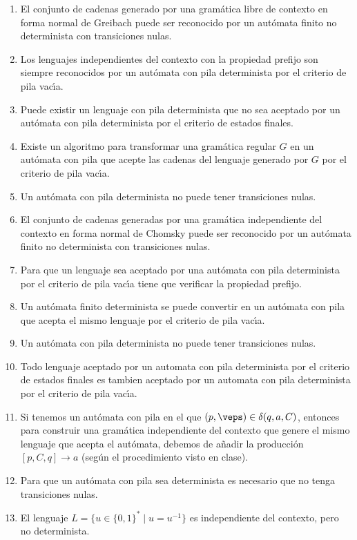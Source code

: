 \begin{enumerate}
    \item El conjunto de cadenas generado por una gramática libre de contexto en forma normal de Greibach puede ser reconocido por un autómata finito no determinista con transiciones nulas.
    \item Los lenguajes independientes del contexto con la propiedad prefijo son siempre reconocidos por un autómata con pila determinista por el criterio de pila vacı́a.
    \item Puede existir un lenguaje con pila determinista que no sea aceptado por un autómata con pila determinista por el criterio de estados finales.
    \item Existe un algoritmo para transformar una gramática regular $G$ en un autómata con pila que acepte las cadenas del lenguaje generado por $G$ por el criterio de pila vacı́a.
    \item Un autómata con pila determinista no puede tener transiciones nulas.
    \item El conjunto de cadenas generadas por una gramática independiente del contexto en forma normal de Chomsky puede ser reconocido por un autómata finito no determinista con transiciones nulas.
    \item Para que un lenguaje sea aceptado por una autómata con pila determinista por el criterio de pila vacı́a tiene que verificar la propiedad prefijo.
    \item Un autómata finito determinista se puede convertir en un autómata con pila que acepta el mismo lenguaje por el criterio de pila vacı́a.
    \item Un autómata con pila determinista no puede tener transiciones nulas.
    \item Todo lenguaje aceptado por un automata con pila determinista por el criterio de estados finales es tambien aceptado por un automata con pila determinista por el criterio de pila vacı́a.
    \item Si tenemos un autómata con pila en el que $(p,\veps)\in \delta(q,a,C)$, entonces para construir una gramática independiente del contexto que genere el mismo lenguaje que acepta el autómata, debemos de añadir la producción $[p,C,q]\rightarrow a$ (según el procedimiento visto en clase).
    \item Para que un autómata con pila sea determinista es necesario que no tenga transiciones nulas.
    \item El lenguaje $L = \{u\in {\{0,1\}}^{\ast} \mid u = u^{-1}\}$ es independiente del contexto, pero no determinista.
\end{enumerate}
